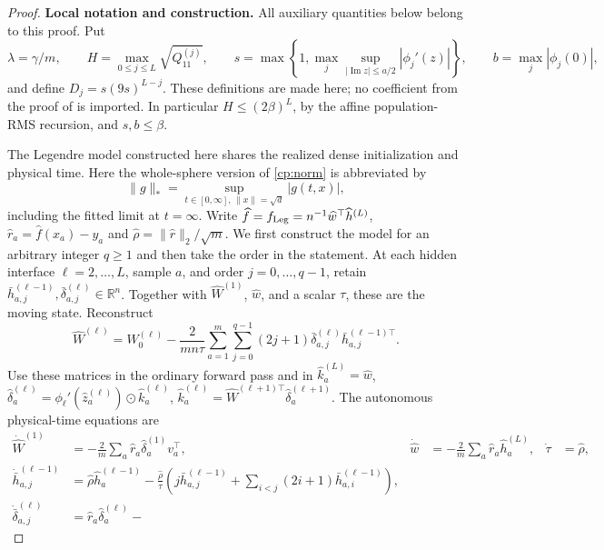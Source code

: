 \begin{proof}
\noindent\textbf{Local notation and construction.}\quad
All auxiliary quantities below belong to this proof. Put
\[
 \lambda=\gamma/m,\qquad
 H=\max_{0\le j\le L}\sqrt{Q^{(j)}_{11}},\qquad
 s=\max\left\{1,\max_j\sup_{|\operatorname{Im}z|\le a/2}
                     |\phi_j'(z)|\right\},\qquad
 b=\max_j|\phi_j(0)|,
\]
and define $D_j=s(9s)^{L-j}$. These definitions are made here;
no coefficient from the proof of  is imported.
In particular $H\le(2\beta)^L$, by the affine population-RMS recursion,
and $s,b\le\beta$.

The Legendre model constructed here shares the realized dense initialization and physical
time.  Here the whole-sphere version of \eqref{cp:norm} is abbreviated by
\[
 \|g\|_*=\sup_{t\in[0,\infty],\,\|x\|=\sqrt d}|g(t,x)|,
\]
including the fitted limit at $t=\infty$.
Write $\widehat f=f_{\rm Leg}=n^{-1}\widehat w^\top\widehat h^{(L)}$,
$\widehat r_a=\widehat f(x_a)-y_a$ and
$\widehat\rho=\|\widehat r\|_2/\sqrt m$. We first construct the model for
an arbitrary integer $q\ge1$ and then take the order in the statement.
At each hidden interface
$\ell=2,\ldots,L$, sample $a$, and order $j=0,\ldots,q-1$, retain
$\bar h_{a,j}^{(\ell-1)},\bar\delta_{a,j}^{(\ell)}\in\mathbb R^n$.
Together with $\widehat W^{(1)}$, $\widehat w$, and a scalar $\tau$,
these are the moving state.  Reconstruct
\begin{equation}
 \widehat W^{(\ell)}=W_0^{(\ell)}-
 \frac2{mn\tau}\sum_{a=1}^m\sum_{j=0}^{q-1}(2j+1)
       \bar\delta_{a,j}^{(\ell)}\bar h_{a,j}^{(\ell-1)\top}.
 \label{cp:eq-legendre-reconstruction}
\end{equation}
Use these matrices in the ordinary forward pass and in
$\widehat k_a^{(L)}=\widehat w$,
$\widehat\delta_a^{(\ell)}=
\phi_\ell'(\widehat z_a^{(\ell)})\odot\widehat k_a^{(\ell)}$,
$\widehat k_a^{(\ell)}=
\widehat W^{(\ell+1)\top}\widehat\delta_a^{(\ell+1)}$.
The autonomous physical-time equations are
\begin{align}
 \dot{\widehat W}^{(1)}&=-\frac2m\sum_a
     \widehat r_a\widehat\delta_a^{(1)}v_a^\top,&
 \dot{\widehat w}&=-\frac2m\sum_a\widehat r_a\widehat h_a^{(L)},&
 \dot\tau&=\widehat\rho,\nonumber\\
 \dot{\bar h}_{a,j}^{(\ell-1)}
 &=\widehat\rho\widehat h_a^{(\ell-1)}-
 \frac{\widehat\rho}{\tau}
 \left(j\bar h_{a,j}^{(\ell-1)}+
       \sum_{i<j}(2i+1)\bar h_{a,i}^{(\ell-1)}\right),\nonumber\\
 \dot{\bar\delta}_{a,j}^{(\ell)}
 &=\widehat r_a\widehat\delta_a^{(\ell)}-

\end{align}
\end{proof}
